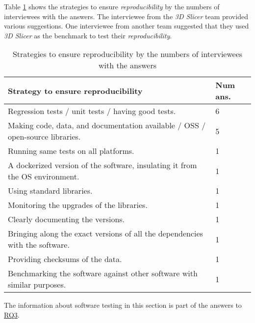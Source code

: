 Table \ref{tab_q20_strategies_reproducibility} shows the strategies to ensure \textit{ reproducibility} by the numbers of interviewees with the answers. The interviewee from the \textit{3D Slicer} team provided various suggestions. One interviewee from another team suggested that they used \textit{3D Slicer} as the benchmark to test their \textit{reproducibility}.

\begin{table}[H]
\centering
\begin{tabular}{ll}
\hline
Strategy to ensure reproducibility & Num ans. \\ \hline
Regression tests / unit tests / having good tests. & 6 \\
Making code, data, and documentation available / OSS / open-source libraries. & 5 \\
Running same tests on all platforms. & 1 \\
A dockerized version of the software,  insulating it from the OS environment. & 1 \\
Using standard libraries. & 1 \\
Monitoring the upgrades of the libraries. & 1 \\
Clearly documenting the versions. & 1 \\
Bringing along the exact versions of all the dependencies with the software. & 1 \\
Providing checksums of the data. & 1 \\
Benchmarking the software against other software with similar purposes. & 1 \\ \hline
\end{tabular}
\caption{\label{tab_q20_strategies_reproducibility}Strategies to ensure  reproducibility by the numbers of interviewees with the answers}
\end{table}

The information about software testing in this section is part of the answers to \hyperlink{rq3}{RQ3}.
